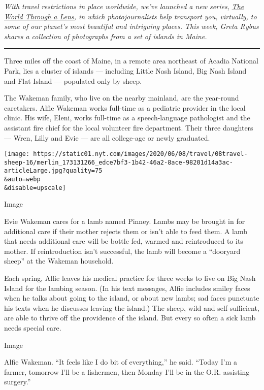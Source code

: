 \emph{With travel restrictions in place worldwide, we've launched a new
series,}
\href{https://www.nytimes.com/column/the-world-through-a-lens}{\emph{The
World Through a Lens}}\emph{, in which photojournalists help transport
you, virtually, to some of our planet's most beautiful and intriguing
places. This week, Greta Rybus shares a collection of photographs from a
set of islands in Maine.}

\begin{center}\rule{0.5\linewidth}{\linethickness}\end{center}

Three miles off the coast of Maine, in a remote area northeast of Acadia
National Park, lies a cluster of islands --- including Little Nash
Island, Big Nash Island and Flat Island --- populated only by sheep.

The Wakeman family, who live on the nearby mainland, are the year-round
caretakers. Alfie Wakeman works full-time as a pediatric provider in the
local clinic. His wife, Eleni, works full-time as a speech-language
pathologist and the assistant fire chief for the local volunteer fire
department. Their three daughters --- Wren, Lilly and Evie --- are all
college-age or newly graduated.

\texttt{[image: https://static01.nyt.com/images/2020/06/08/travel/08travel-sheep-16/merlin\_173131266\_edce7bf3-1b42-46a2-8ace-98201d14a3ac-articleLarge.jpg?quality=75\\\&auto=webp\\\&disable=upscale]}

Image

Evie Wakeman cares for a lamb named Pinney. Lambs may be brought in for
additional care if their mother rejects them or isn't able to feed them.
A lamb that needs additional care will be bottle fed, warmed and
reintroduced to its mother. If reintroduction isn't successful, the lamb
will become a ``dooryard sheep'' at the Wakeman household.

Each spring, Alfie leaves his medical practice for three weeks to live
on Big Nash Island for the lambing season. (In his text messages, Alfie
includes smiley faces when he talks about going to the island, or about
new lambs; sad faces punctuate his texts when he discusses leaving the
island.) The sheep, wild and self-sufficient, are able to thrive off the
providence of the island. But every so often a sick lamb needs special
care.

Image

Alfie Wakeman. ``It feels like I do bit of everything,'' he said.
``Today I'm a farmer, tomorrow I'll be a fishermen, then Monday I'll be
in the O.R. assisting surgery.''

